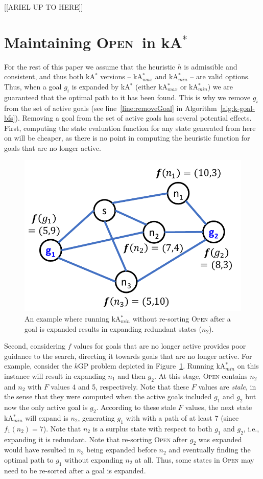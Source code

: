 \documentclass{aicom2e}
\newcommand{\kgs}{$k$GP}
\newcommand{\kastar}{kA$^*$}
\newcommand{\kastarmin}{kA$^*_{min}$}
\newcommand{\kastarmax}{kA$^*_{max}$}
\newcommand{\open}{\textsc{Open}}
\begin{document}
[[ARIEL UP TO HERE]]

\section{Maintaining \open\ in \kastar{}} \label{sec:lazy}


For the rest of this paper we assume that the heuristic $h$ is admissible and
consistent, and thus both \kastar{} versions -- \kastarmax{} and \kastarmin{} -- are valid options. Thus, when a goal $g_i$ is
expanded by \kastar{} (either \kastarmax{} or \kastarmin{}) we are guaranteed that
the optimal path to it has been found. This is why we remove $g_i$ from the
set of active goals (see line~\ref{line:removeGoal} in
Algorithm~\ref{alg:k-goal-bfs}). Removing a goal from the set of active goals
has several potential effects. First, computing the state evaluation function for any state generated from here on will be cheaper, as there is no point in
computing the heuristic function for goals that are no longer active.


\begin{figure}
    \includegraphics[width=0.7\columnwidth]{need-resort_cropped.pdf}
    \caption{An example where running \kastarmin{} without re-sorting \open{} after a goal is expanded
        results in expanding redundant states ($n_2$).}
    \label{fig:need-resort}
\end{figure}


Second, considering $f$ values for goals that are no longer active provides poor guidance to the search, directing it towards goals that are no longer active. For example, consider the \kgs{} problem depicted in Figure~\ref{fig:need-resort}. Running \kastarmin{} on this instance will result in expanding $n_1$ and then $g_2$. At this stage, \open{} contains $n_2$ and $n_2$ with $F$ values 4 and 5, respectively.
Note that these $F$ values are {\em stale}, in the sense that they
were computed when the active goals included $g_1$ and $g_2$
but now the only active goal is $g_2$.
According to these stale $F$ values, the next state \kastarmin{}
will expand is $n_2$, generating $g_1$ with with a path of at least 7
(since $f_1(n_2)=7$). Note that $n_2$ is a surplus state with respect to both $g_1$ and $g_2$, i.e., expanding it is redundant. Note that re-sorting \open{} after $g_2$ was expanded would have resulted in $n_3$ being expanded before $n_2$ and eventually finding the optimal path to $g_1$ without expanding $n_2$ at all. Thus, some states in \open{} may need to be re-sorted after a goal is expanded.
\end{document}
